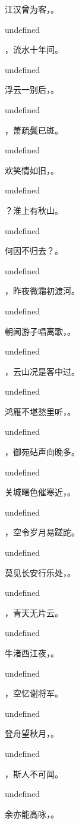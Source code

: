 \documentclass[12pt, a4paper, addpoints]{exam}
\begin{document}
\begin{questions}
\question[3] 江汉曾为客，\fillin。

undefined

\question[3] \fillin，流水十年间。

undefined

\question[3] 浮云一别后，\fillin。

undefined

\question[3] \fillin，萧疏鬓已斑。

undefined

\question[3] 欢笑情如旧，\fillin。

undefined

\question[3] \fillin？淮上有秋山。

undefined

\question[3] 何因不归去？\fillin。

undefined

\question[3] \fillin，昨夜微霜初渡河。

undefined

\question[3] 朝闻游子唱离歌，\fillin。

undefined

\question[3] \fillin，云山况是客中过。

undefined

\question[3] 鸿雁不堪愁里听，\fillin。

undefined

\question[3] \fillin，御苑砧声向晚多。

undefined

\question[3] 关城曙色催寒近，\fillin。

undefined

\question[3] \fillin，空令岁月易蹉跎。

undefined

\question[3] 莫见长安行乐处，\fillin。

undefined

\question[3] \fillin，青天无片云。

undefined

\question[3] 牛渚西江夜，\fillin。

undefined

\question[3] \fillin，空忆谢将军。

undefined

\question[3] 登舟望秋月，\fillin。

undefined

\question[3] \fillin，斯人不可闻。

undefined

\question[3] 余亦能高咏，\fillin。


\end{questions}
\end{document}
